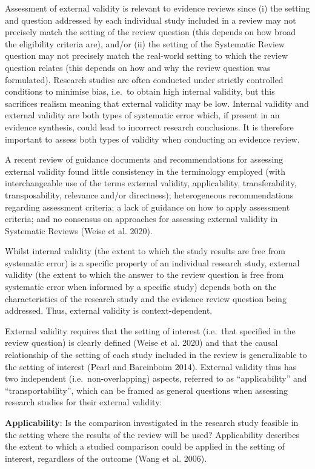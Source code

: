 \documentclass[
  letterpaper,
  DIV=11,
  numbers=noendperiod]{scrreprt}
\begin{document}
Assessment of external validity is relevant to evidence reviews since
(i) the setting and question addressed by each individual study included
in a review may not precisely match the setting of the review question
(this depends on how broad the eligibility criteria are), and/or (ii)
the setting of the Systematic Review question may not precisely match
the real-world setting to which the review question relates (this
depends on how and why the review question was formulated). Research
studies are often conducted under strictly controlled conditions to
minimise bias, i.e.~to obtain high internal validity, but this
sacrifices realism meaning that external validity may be low. Internal
validity and external validity are both types of systematic error which,
if present in an evidence synthesis, could lead to incorrect research
conclusions. It is therefore important to assess both types of validity
when conducting an evidence review.

A recent review of guidance documents and recommendations for assessing
external validity found little consistency in the terminology employed
(with interchangeable use of the terms external validity, applicability,
transferability, transposability, relevance and/or directness);
heterogeneous recommendations regarding assessment criteria; a lack of
guidance on how to apply assessment criteria; and no consensus on
approaches for assessing external validity in Systematic Reviews (Weise
et al. 2020).

Whilst internal validity (the extent to which the study results are free
from systematic error) is a specific property of an individual research
study, external validity (the extent to which the answer to the review
question is free from systematic error when informed by a specific
study) depends both on the characteristics of the research study and the
evidence review question being addressed. Thus, external validity is
context-dependent.

External validity requires that the setting of interest (i.e.~that
specified in the review question) is clearly defined (Weise et al. 2020)
and that the causal relationship of the setting of each study included
in the review is generalizable to the setting of interest (Pearl and
Bareinboim 2014). External validity thus has two independent
(i.e.~non-overlapping) aspects, referred to as ``applicability'' and
``transportability'', which can be framed as general questions when
assessing research studies for their external validity:

\textbf{Applicability}: Is the comparison investigated in the research
study feasible in the setting where the results of the review will be
used? Applicability describes the extent to which a studied comparison
could be applied in the setting of interest, regardless of the outcome
(Wang et al. 2006).
\end{document}

